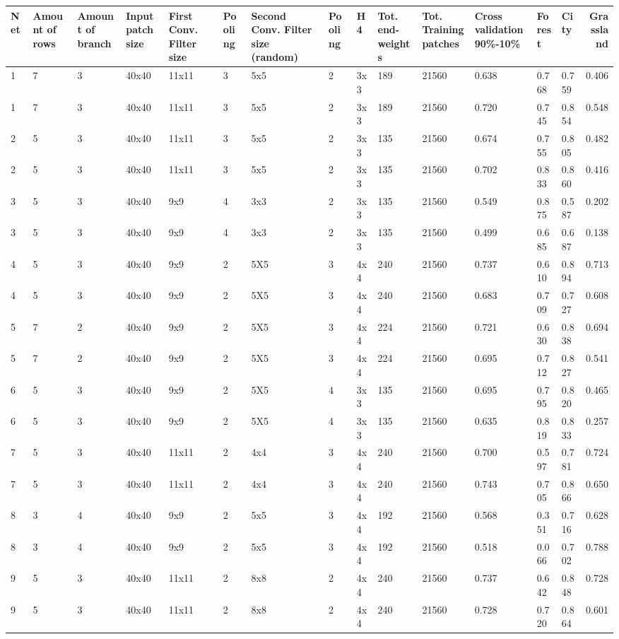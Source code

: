\documentclass[a4paper,onecolumn]{report}
\begin{document}
\begin{appendices}
\begin{tiny}
	\begin{center}
		\begin{tabular}{| l |p{0.5cm} |p{0.5cm} |p{0.5cm} |p{0.75cm} |p{0.7cm} |p{0.7cm} |p{0.75cm} |p{0.75cm} |p{0.75cm} |p{0.5cm} |p{0.8cm} |p{0.8cm} |p{0.8cm} |r | }
			\hline
			Net	& Amount of rows	& Amount of branch	& Input patch size	& First Conv. Filter size	& Pooling	& Second Conv. Filter size (random)&	Pooling	&H4	& Tot. end-weights	&Tot. Training patches	& Cross validation 90\%-10\% & Forest &	City	& Grassland \\ \hline
			
			1&	7&	3&	40x40&	11x11& 	3&	5x5&	2&	3x3&	189&	21560&	0.638&	0.768&	0.759&	0.406 \\ \hline
			1&	7&	3&	40x40&	11x11&	3&	5x5&	2&	3x3&	189&	21560&	0.720&	0.745&	0.854&	0.548\\ \hline
			2&	5&	3&	40x40&	11x11& 	3&	5x5&	2&	3x3&	135&	21560&	0.674&	0.755&	0.805&	0.482\\ \hline
			2&	5&	3&	40x40&	11x11& 	3&	5x5&	2&	3x3&	135&	21560&	0.702&	0.833&	0.860&	0.416\\ \hline
			3&	5&	3&	40x40&	9x9&	4&	3x3&	2&	3x3&	135&	21560&	0.549&	0.875&	0.587&	0.202\\ \hline
			3&	5&	3&	40x40&	9x9&	4&	3x3&	2&	3x3&	135&	21560&	0.499&	0.685&	0.687&	0.138\\ \hline
			4&	5&	3&	40x40&	9x9&	2&	5X5&	3&	4x4&	240&	21560&	0.737&	0.610&	0.894&	0.713\\ \hline
			4&	5&	3&	40x40&	9x9&	2&	5X5&	3&	4x4&	240&	21560&	0.683&	0.709&	0.727&	0.608\\ \hline
			5&	7&	2&	40x40&	9x9&	2&	5X5&	3&	4x4&	224&	21560&	0.721&	0.630&	0.838&	0.694\\ \hline
			5&	7&	2&	40x40&	9x9&	2&	5X5&	3&	4x4&	224&	21560&	0.695&	0.712&	0.827&	0.541\\ \hline
			6&	5&	3&	40x40&	9x9&	2&	5X5&	4&	3x3&	135&	21560&	0.695&	0.795&	0.820&	0.465\\ \hline
			6&	5&	3&	40x40&	9x9&	2&	5X5&	4&	3x3&	135&	21560&	0.635&	0.819&	0.833&	0.257\\ \hline
			7&	5&	3&	40x40&	11x11& 	2&	4x4&	3&	4x4&	240&	21560&	0.700&	0.597&	0.781&	0.724\\ \hline
			7&	5&	3&	40x40&	11x11& 	2&	4x4&	3&	4x4&	240&	21560&	0.743&	0.705&	0.866&	0.650\\ \hline
			8&	3&	4&	40x40&	9x9&	2&	5x5&	3&	4x4&	192&	21560&	0.568&	0.351&	0.716&	0.628\\ \hline
			8&	3&	4&	40x40&	9x9&	2&	5x5&	3&	4x4&	192&	21560&	0.518&	0.066&	0.702&	0.788\\ \hline
			9&	5&	3&	40x40&	11x11& 	2&	8x8&	2&	4x4&	240&	21560&	0.737&	0.642&	0.848&	0.728\\ \hline
			9&	5&	3&	40x40&	11x11& 	2&	8x8&	2&	4x4&	240&	21560&	0.728&	0.720&	0.864&	0.601 \\ \hline
			

\end{tabular}
\end{center}
\end{tiny}
\end{appendices}
\end{document}
